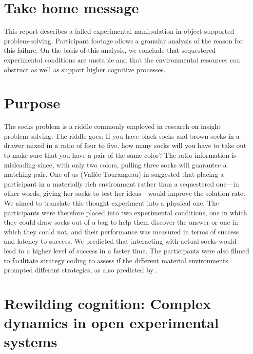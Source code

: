 \documentclass[twocolumn, serif, empirical, authordate]{jote-article}
\begin{document}
\section*{Take home message} 
This report describes a failed experimental manipulation in object-supported problem-solving. Participant footage allows a granular analysis of the reason for this failure. On the basis of this analysis, we conclude that sequestered experimental conditions are unstable and that the environmental resources can obstruct as well as support higher cognitive processes. 




\section*{Purpose} 
The socks problem is a riddle commonly employed in research on insight problem-solving. The riddle goes: If you have black socks and brown socks in a drawer mixed in a ratio of four to five, how many socks will you have to take out to make sure that you have a pair of the same color? The ratio information is misleading since, with only two colors, pulling three socks will guarantee a matching pair. One of us (Vallée-Tourangeau) in \textcite{Vallee-Tourangeau2020} suggested that placing a participant in a materially rich environment rather than a sequestered one---in other words, giving her socks to test her ideas---would improve the solution rate. We aimed to translate this thought experiment into a physical one. The participants were therefore placed into two experimental conditions, one in which they could draw socks out of a bag to help them discover the answer or one in which they could not, and their performance was measured in terms of success and latency to success. We predicted that interacting with actual socks would lead to a higher level of success in a faster time. The participants were also filmed to facilitate strategy coding to assess if the different material environments prompted different strategies, as also predicted by \textcite{Vallee-Tourangeau2020}. 

\section*{Rewilding cognition: Complex dynamics in open experimental systems}
\end{document}
